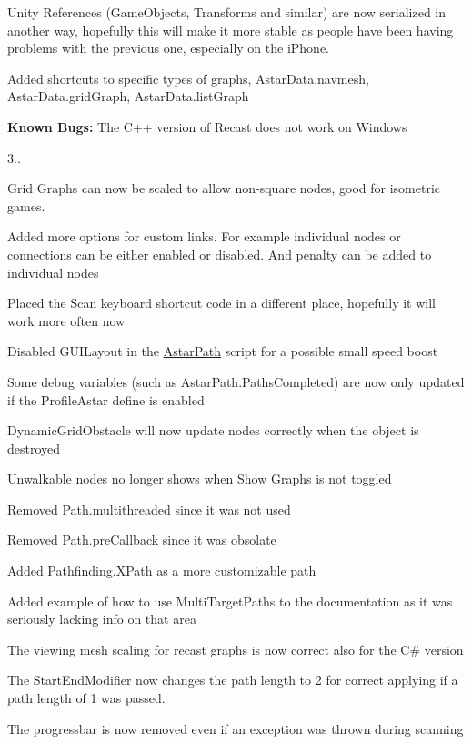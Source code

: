\begin{DoxyItemize}
\begin{DoxyItemize}
\item Unity References (Game\+Object\textquotesingle{}s, Transforms and similar) are now serialized in another way, hopefully this will make it more stable as people have been having problems with the previous one, especially on the i\+Phone.
\item Added shortcuts to specific types of graphs, Astar\+Data.\+navmesh, Astar\+Data.\+grid\+Graph, Astar\+Data.\+list\+Graph
\item {\bfseries{Known Bugs\+:}} The C++ version of Recast does not work on Windows
\end{DoxyItemize}
\item 3..
\begin{DoxyItemize}
\item Grid Graphs can now be scaled to allow non-\/square nodes, good for isometric games.
\item Added more options for custom links. For example individual nodes or connections can be either enabled or disabled. And penalty can be added to individual nodes
\item Placed the Scan keyboard shortcut code in a different place, hopefully it will work more often now
\item Disabled G\+U\+I\+Layout in the \mbox{\hyperlink{class_astar_path}{Astar\+Path}} script for a possible small speed boost
\item Some debug variables (such as Astar\+Path.\+Paths\+Completed) are now only updated if the Profile\+Astar define is enabled
\item Dynamic\+Grid\+Obstacle will now update nodes correctly when the object is destroyed
\item Unwalkable nodes no longer shows when Show Graphs is not toggled
\item Removed Path.\+multithreaded since it was not used
\item Removed Path.\+pre\+Callback since it was obsolate
\item Added Pathfinding.\+X\+Path as a more customizable path
\item Added example of how to use Multi\+Target\+Paths to the documentation as it was seriously lacking info on that area
\item The viewing mesh scaling for recast graphs is now correct also for the C\# version
\item The Start\+End\+Modifier now changes the path length to 2 for correct applying if a path length of 1 was passed.
\item The progressbar is now removed even if an exception was thrown during scanning

\end{DoxyItemize}
\end{DoxyItemize}
